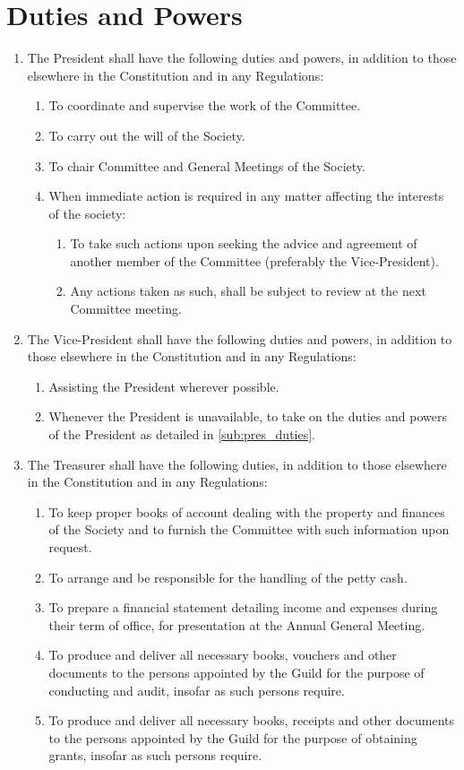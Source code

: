 \documentclass[a4paper]{article}
\newenvironment{enumsection}[1]{\section{#1} \begin{enumerate}[ref=\thesection.\theenumi]}{\end{enumerate}}
\begin{document}
\begin{enumsection}{Duties and Powers} \label{sec:duties}
    \item The President shall have the following duties and powers, in addition to those elsewhere in the Constitution and in any Regulations: \label{sub:pres_duties}
    \begin{enumerate}
        \item To coordinate and supervise the work of the Committee.
        \item To carry out the will of the Society.
        \item To chair Committee and General Meetings of the Society.
        \item When immediate action is required in any matter affecting the interests of the society: \label{sub:exec_power}
        \begin{enumerate}
            \item To take such actions upon seeking the advice and agreement of another member of the Committee (preferably the Vice-President).
            \item Any actions taken as such, shall be subject to review at the next Committee meeting. 
        \end{enumerate}
    \end{enumerate}
    
    \item The Vice-President shall have the following duties and powers, in addition to those elsewhere in the Constitution and in any Regulations:
    \begin{enumerate}
        \item Assisting the President wherever possible. 
        \item Whenever the President is unavailable, to take on the duties and powers of the President as detailed in \cref{sub:pres_duties}.
    \end{enumerate}
    
    \item The Treasurer shall have the following duties, in addition to those elsewhere in the Constitution and in any Regulations:
    \begin{enumerate}
        \item To keep proper books of account dealing with the property and finances of the Society and to furnish the Committee with such information upon request.
        \item To arrange and be responsible for the handling of the petty cash.
        \item To prepare a financial statement detailing income and expenses during their term of office, for presentation at the Annual General Meeting.
        \item To produce and deliver all necessary books, vouchers and other documents to the persons appointed by the Guild for the purpose of conducting and audit, insofar as such persons require.
        \item To produce and deliver all necessary books, receipts and other documents to the persons appointed by the Guild for the purpose of obtaining grants, insofar as such persons require.
    \end{enumerate}
    

\end{enumsection}
\end{document}
